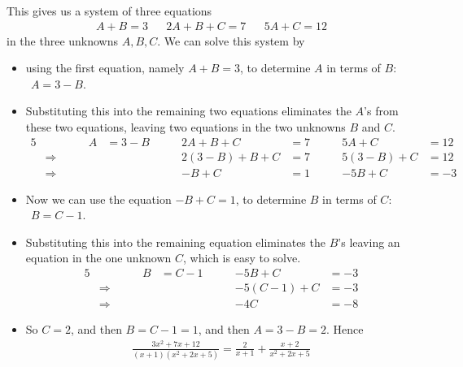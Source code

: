 \begin{eg}
\begin{itemize}
This gives us a system of three equations
\begin{align*}
 A+B=3 && 2A+B+C=7 && 5A+C=12
\end{align*}
in the three unknowns $A,B,C$. We can solve this system by
\begin{itemize}
\item
using the first equation, namely $A+B=3$, to determine $A$ in terms of
$B$: $\ \ A=3-B$.
\item
Substituting this into the remaining two equations eliminates the $A$'s
from these two equations, leaving two equations in the two unknowns $B$
and $C$.
\begin{alignat*}{5}
& & A&=3-B\qquad & 2A+B+C&=7\qquad & 5A+C&=12 \\
&\Rightarrow\qquad & & & 2(3-B)+B+C&=7 & 5(3-B)+C&=12\\
&\Rightarrow & & & -B+C&=1 & -5B+C&=-3
\end{alignat*}
\item
Now we can use the equation $-B+C=1$, to determine $B$ in terms of $C$:
$\ \ B=C-1$.
\item
Substituting this into the remaining equation eliminates the $B$'s
leaving an equation in the one unknown $C$, which is easy to solve.
\begin{alignat*}{5}
& & B&=C-1\qquad & -5B+C&=-3\\
&\Rightarrow\qquad &  &  & -5(C-1)+C&=-3\\
&\Rightarrow &  &  & -4C&=-8
\end{alignat*}
\item
So $C=2$, and then $B=C-1=1$, and then $A=3-B=2$. Hence
\begin{align*}
\frac{3x^2+7x+12}{(x+1)(x^2+2x+5)}
=\frac{2}{x+1}+\frac{x+2}{x^2+2x+5}
\end{align*}

\end{itemize}


\end{itemize}
\end{eg}
